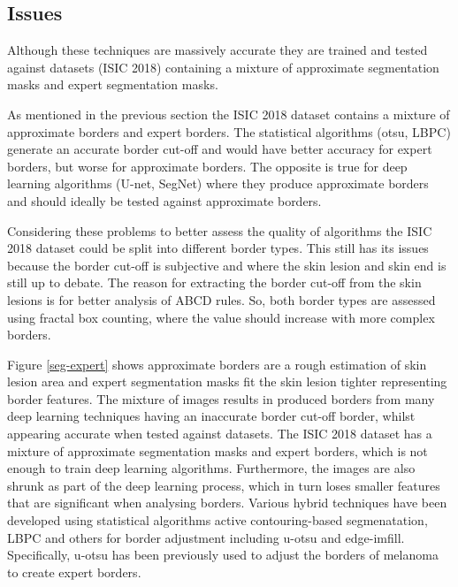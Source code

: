 \subsection{Issues}
Although these techniques are massively accurate they are trained and tested against datasets (ISIC 2018) containing a mixture of approximate segmentation masks and expert segmentation masks. 

As mentioned in the previous section the ISIC 2018 dataset contains a mixture of approximate borders and expert borders. The statistical algorithms (otsu, LBPC) generate an accurate border cut-off and would have better accuracy for expert borders, but worse for approximate borders. The opposite is true for deep learning algorithms (U-net, SegNet) where they produce approximate borders and should ideally be tested against approximate borders.

Considering these problems to better assess the quality of algorithms the ISIC 2018 dataset could be split into different border types. This still has its issues because the border cut-off is subjective and where the skin lesion and skin end is still up to debate. The reason for extracting the border cut-off from the skin lesions is for better analysis of ABCD rules. So, both border types are assessed using fractal box counting, where the value should increase with more complex borders. 

Figure \ref{seg-expert} shows approximate borders are a rough estimation of skin lesion area and expert segmentation masks fit the skin lesion tighter representing border features. The mixture of images results in produced borders from many deep learning techniques having an inaccurate border cut-off border, whilst appearing accurate when tested against datasets. The ISIC 2018 dataset has a mixture of approximate segmentation masks and expert borders, which is not enough to train deep learning algorithms. Furthermore, the images are also shrunk as part of the deep learning process, which in turn loses smaller features that are significant when analysing borders. Various hybrid techniques have been developed using statistical algorithms active contouring-based segmenatation\cite{Riaz2019}, LBPC and others for border adjustment including u-otsu and edge-imfill. Specifically, u-otsu has been previously used to adjust the borders of melanoma to create expert borders\cite{}.


